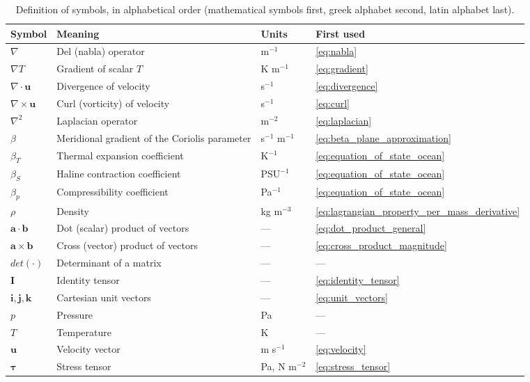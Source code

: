 \documentclass[12pt]{article}
\numberwithin{equation}{section}
\numberwithin{figure}{section}
\numberwithin{table}{section}
\begin{document}
\begin{table}[h]
\centering
\renewcommand{\arraystretch}{1.15}
\begin{tabular}{p{2cm} p{8cm} p{2.2cm} p{2.2cm}}
\hline
\textbf{Symbol} & \textbf{Meaning} & \textbf{Units} & \textbf{First used} \\
\hline
$\nabla$ & Del (nabla) operator & m$^{-1}$ & \ref{eq:nabla} \\
$\nabla T$ & Gradient of scalar $T$ & K m$^{-1}$ & \ref{eq:gradient} \\
$\nabla\cdot\mathbf{u}$ & Divergence of velocity & s$^{-1}$ & \ref{eq:divergence} \\
$\nabla\times\mathbf{u}$ & Curl (vorticity) of velocity & s$^{-1}$ & \ref{eq:curl} \\
$\nabla^2$ & Laplacian operator & m$^{-2}$ & \ref{eq:laplacian} \\
$\beta$ & Meridional gradient of the Coriolis parameter & s$^{-1}$ m$^{-1}$ & \ref{eq:beta_plane_approximation} \\
$\beta_T$ & Thermal expansion coefficient & K$^{-1}$ & \ref{eq:equation_of_state_ocean} \\
$\beta_S$ & Haline contraction coefficient & PSU$^{-1}$ & \ref{eq:equation_of_state_ocean} \\
$\beta_p$ & Compressibility coefficient & Pa$^{-1}$ & \ref{eq:equation_of_state_ocean} \\
$\rho$ & Density & kg m$^{-3}$ & \ref{eq:lagrangian_property_per_mass_derivative} \\
$\mathbf{a}\cdot\mathbf{b}$ & Dot (scalar) product of vectors & --- & \ref{eq:dot_product_general} \\
$\mathbf{a}\times\mathbf{b}$ & Cross (vector) product of vectors & --- & \ref{eq:cross_product_magnitude} \\
$det(\cdot)$ & Determinant of a matrix & --- & --- \\
$\mathbf{I}$ & Identity tensor & --- & \ref{eq:identity_tensor} \\
$\mathbf{i},\mathbf{j},\mathbf{k}$ & Cartesian unit vectors & --- & \ref{eq:unit_vectors} \\
$p$ & Pressure & Pa & --- \\
$T$ & Temperature & K & --- \\
$\mathbf{u}$ & Velocity vector & m s$^{-1}$ & \ref{eq:velocity} \\
$\boldsymbol{\tau}$ & Stress tensor & Pa, N m$^{-2}$ & \ref{eq:stress_tensor} \\
\hline
\end{tabular}
\caption{
  Definition of symbols, in alphabetical order (mathematical symbols first,
  greek alphabet second, latin alphabet last).
  }
\end{table}

\printindex
\end{document}
